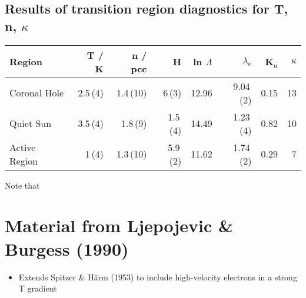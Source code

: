 \documentclass[11pt]{article}
\begin{document}
\subsection{Results of transition region diagnostics for T, n, \(\kappa\)}
\label{sec:orgheadline11}

\begin{center}
\begin{tabular}{lrrrrrrr}
Region & T / K & n / pcc & H & ln \(\Lambda\) & \(\lambda_{\text{e}}\) & K\(_{\text{n}}\) & \(\kappa\)\\
\hline
Coronal Hole & 2.5\,(4) & 1.4\,(10) & 6\,(3) & 12.96 & 9.04\,(2) & 0.15 & 13\\
Quiet Sun & 3.5\,(4) & 1.8\,(9) & 1.5\,(4) & 14.49 & 1.23\,(4) & 0.82 & 10\\
Active Region & 1\,(4) & 1.3\,(10) & 5.9\,(2) & 11.62 & 1.74\,(2) & 0.29 & 7\\
\end{tabular}
\end{center}

Note that 
\section{Material from Ljepojevic \& Burgess (1990)}
\label{sec:orgheadline18}
\begin{itemize}
\item Extends Spitzer \& Härm (1953) to include high-velocity electrons in a strong T gradient
\end{itemize}
\end{document}
